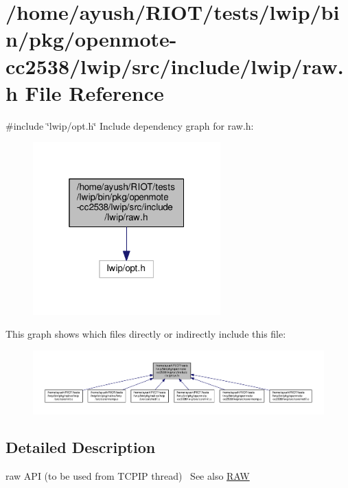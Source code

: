 \hypertarget{openmote-cc2538_2lwip_2src_2include_2lwip_2raw_8h}{}\section{/home/ayush/\+R\+I\+O\+T/tests/lwip/bin/pkg/openmote-\/cc2538/lwip/src/include/lwip/raw.h File Reference}
\label{openmote-cc2538_2lwip_2src_2include_2lwip_2raw_8h}
{\ttfamily \#include \char`\"{}lwip/opt.\+h\char`\"{}}\newline
Include dependency graph for raw.\+h\+:
\nopagebreak
\begin{figure}[H]
\begin{center}
\leavevmode
\includegraphics[width=205pt]{openmote-cc2538_2lwip_2src_2include_2lwip_2raw_8h__incl}
\end{center}
\end{figure}
This graph shows which files directly or indirectly include this file\+:
\nopagebreak
\begin{figure}[H]
\begin{center}
\leavevmode
\includegraphics[width=350pt]{openmote-cc2538_2lwip_2src_2include_2lwip_2raw_8h__dep__incl}
\end{center}
\end{figure}


\subsection{Detailed Description}
raw A\+PI (to be used from T\+C\+P\+IP thread)~\newline
See also \hyperlink{group__raw__raw}{R\+AW} 